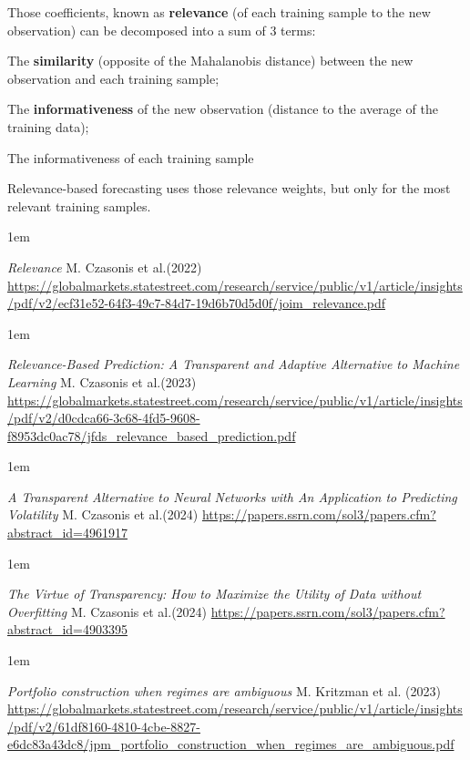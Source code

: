 \documentclass[a5paper]{article}
\let\d\textbf
\newenvironment{reference}{%
  \medskip\goodbreak
  \parskip 0pt
  \raggedright
  \leftskip 1em
  \obeylines
}{\par\medskip\goodbreak}
\begin{document}
Those coefficients, known as \d{relevance} (of each training sample to the new observation)
can be decomposed into a sum of 3 terms:
\begin{compactitem}[--]
\item The \d{similarity} (opposite of the Mahalanobis distance) between the new observation and each training sample;
\item The \d{informativeness} of the new observation (distance to the average of the training data);
\item The informativeness of each training sample
\end{compactitem}

Relevance-based forecasting uses those relevance weights,
but only for the most relevant training samples. 

\begin{reference}
  \emph{Relevance}
  M. Czasonis et al.(2022)
  \url{https://globalmarkets.statestreet.com/research/service/public/v1/article/insights/pdf/v2/ecf31e52-64f3-49c7-84d7-19d6b70d5d0f/joim_relevance.pdf}
\end{reference}

\begin{reference}
  \emph{Relevance-Based Prediction: A Transparent and Adaptive Alternative to Machine Learning}
  M. Czasonis et al.(2023)
  \url{https://globalmarkets.statestreet.com/research/service/public/v1/article/insights/pdf/v2/d0cdca66-3c68-4fd5-9608-f8953dc0ac78/jfds_relevance_based_prediction.pdf}
\end{reference}

\begin{reference}
  \emph{A Transparent Alternative to Neural Networks with An Application to Predicting Volatility}
  M. Czasonis et al.(2024)
  \url{https://papers.ssrn.com/sol3/papers.cfm?abstract_id=4961917}
\end{reference}

\begin{reference}
  \emph{The Virtue of Transparency: How to Maximize the Utility of Data without Overfitting}
  M. Czasonis et al.(2024)
  \url{https://papers.ssrn.com/sol3/papers.cfm?abstract_id=4903395}
\end{reference}

\begin{reference}
  \emph{Portfolio construction when regimes are ambiguous}
  M. Kritzman et al. (2023)
  \url{https://globalmarkets.statestreet.com/research/service/public/v1/article/insights/pdf/v2/61df8160-4810-4cbe-8827-e6dc83a43dc8/jpm_portfolio_construction_when_regimes_are_ambiguous.pdf}
\end{reference}
\end{document}
